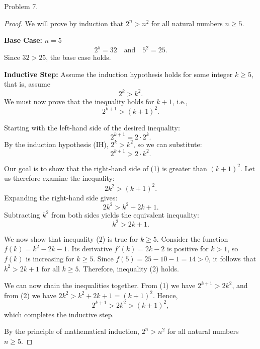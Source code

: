 \documentclass{article}
\begin{document}
Problem 7.
\begin{proof}
We will prove by induction that $2^{n} > n^{2}$ for all natural numbers $n \geq 5$.

\textbf{Base Case: } $n = 5$
\[
2^{5} = 32 \quad \text{and} \quad 5^{2} = 25.
\]
Since $32 > 25$, the base case holds.

\textbf{Inductive Step:} Assume the induction hypothesis holds for some integer $k \geq 5$, that is, assume
\[
2^{k} > k^{2}. \tag{IH}
\]
We must now prove that the inequality holds for $k+1$, i.e.,
\[
2^{k+1} > (k+1)^{2}.
\]

Starting with the left-hand side of the desired inequality:
\[
2^{k+1} = 2 \cdot 2^{k}.
\]
By the induction hypothesis (IH), $2^{k} > k^{2}$, so we can substitute:
\[
2^{k+1} > 2 \cdot k^{2}. \tag{1}
\]

Our goal is to show that the right-hand side of (1) is greater than $(k+1)^{2}$. Let us therefore examine the inequality:
\[
2k^{2} > (k+1)^{2}.
\]
Expanding the right-hand side gives:
\[
2k^{2} > k^{2} + 2k + 1.
\]
Subtracting $k^2$ from both sides yields the equivalent inequality:
\[
k^{2} > 2k + 1. \tag{2}
\]

We now show that inequality (2) is true for $k \geq 5$. Consider the function $f(k) = k^{2} - 2k - 1$. Its derivative $f'(k) = 2k - 2$ is positive for $k > 1$, so $f(k)$ is increasing for $k \geq 5$. Since $f(5) = 25 - 10 - 1 = 14 > 0$, it follows that $k^{2} > 2k + 1$ for all $k \geq 5$. Therefore, inequality (2) holds.

We can now chain the inequalities together. From (1) we have $2^{k+1} > 2k^{2}$, and from (2) we have $2k^{2} > k^{2} + 2k + 1 = (k+1)^{2}$. Hence,
\[
2^{k+1} > 2k^{2} > (k+1)^{2},
\]
which completes the inductive step.

By the principle of mathematical induction, $2^{n} > n^{2}$ for all natural numbers $n \geq 5$.
\end{proof}
\end{document}
